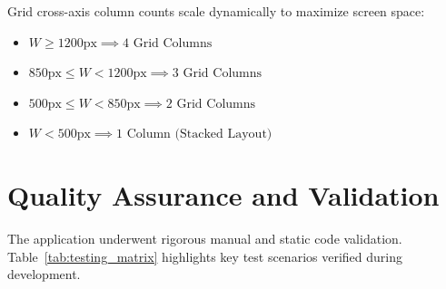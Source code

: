\documentclass[11pt,a4paper]{article}
\begin{document}
Grid cross-axis column counts scale dynamically to maximize screen space:
\begin{itemize}[leftmargin=*]
    \item $W \ge 1200\text{px} \implies 4 \text{ Grid Columns}$
    \item $850\text{px} \le W < 1200\text{px} \implies 3 \text{ Grid Columns}$
    \item $500\text{px} \le W < 850\text{px} \implies 2 \text{ Grid Columns}$
    \item $W < 500\text{px} \implies 1 \text{ Column (Stacked Layout)}$
\end{itemize}

\FloatBarrier

\section{Quality Assurance and Validation}

The application underwent rigorous manual and static code validation. Table~\ref{tab:testing_matrix} highlights key test scenarios verified during development.
\end{document}
